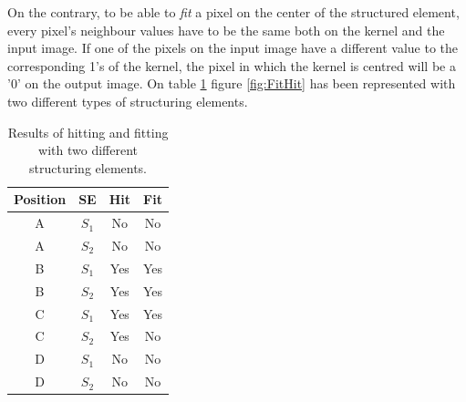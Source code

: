 On the contrary, to be able to \textit{fit} a pixel on the center of the structured element, every pixel's neighbour values have to be the same both on the kernel and the input image. If one of the pixels on the input image have a different value to the corresponding 1's of the kernel, the pixel in which the kernel is centred will be a '0' on the output image. On table \ref{tab:HitFitResults} figure \ref{fig:FitHit} has been represented with two different types of structuring elements.
\begin{table}[htbp]
\centering
\begin{tabular}{|c|c|c|c|}
\hline
 \:Position\: &SE &\:\:\:Hit\:\:\: &\:\:\:Fit\:\:\: \\\hline
 \hline
 A &$S_{1}$ &No &No\\\hline
 A &$S_{2}$ &No &No\\\hline
 B &$S_{1}$ &Yes &Yes\\\hline
 B &$S_{2}$ &Yes &Yes\\\hline
 C &$S_{1}$ &Yes &Yes\\\hline
 C &$S_{2}$ &Yes &No\\\hline
 D &$S_{1}$ &No &No\\\hline
 D &$S_{2}$ &No &No\\\hline
\end{tabular}
\caption{Results of hitting and fitting with two different structuring elements.}
\label{tab:HitFitResults}
\end{table}

